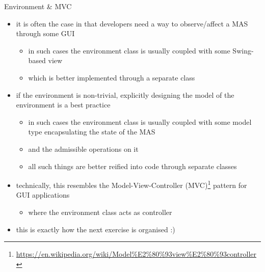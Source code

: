 \documentclass[presentation]{beamer}\mode<presentation>{\usetheme{AMSBolognaFC}}
\begin{document}
\begin{frame}[c]{Environment \& MVC}
    
    \begin{itemize}
        
        \item it is often the case in \jason{} that developers need a way to observe/affect a MAS through some GUI
        \begin{itemize}
            \item in such cases the environment class is usually coupled with some Swing-based view
            \item which is better implemented through a separate class
        \end{itemize}
        
        \vfill
        
        \item if the environment is non-trivial, explicitly designing the \alert{model} of the environment is a best practice
        \begin{itemize}
            \item in such cases the environment class is usually coupled with some model type encapsulating the state of the MAS
            \item and the admissible operations on it
            \item all such things are better reified into code through separate classes
        \end{itemize}
        
        \vfill
        
        \item technically, this resembles the Model-View-Controller (MVC)\footnote{\url{https://en.wikipedia.org/wiki/Model\%E2\%80\%93view\%E2\%80\%93controller}} pattern for GUI applications
        \begin{itemize}
            \item where the environment class acts as controller
        \end{itemize}
    
        \vfill
        
        \item this is exactly how the next exercise is organised :)
        
    \end{itemize}
    
\end{frame} 
\end{document}
